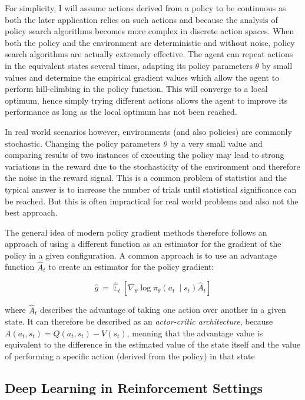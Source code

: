 For simplicity, I will assume actions derived from a policy to be continuous as both the later application relies on
such actions and because the analysis of policy search algorithms becomes more complex in discrete action spaces. When
both the policy and the environment are deterministic and without noise, policy search algorithms are actually extremely
effective. The agent can repeat actions in the equivalent states several times, adapting its policy parameters $\theta$ by
small values and determine the empirical gradient values which allow the agent to perform hill-climbing in the policy
function. This will converge to a local optimum, hence simply trying different actions allows the agent to improve its
performance as long as the local optimum has not been reached.

In real world scenarios however, environments (and also policies) are commonly stochastic. Changing the policy
parameters $\theta$ by a very small value and comparing results of two instances of executing the policy may lead to
strong variations in the reward due to the stochasticity of the environment and therefore the noise in the reward
signal. This is a common problem of statistics and the typical answer is to increase the number of trials until
statistical significance can be reached. But this is often impractical for real world problems and also not the best
approach.

The general idea of modern policy gradient methods therefore follows an approach of using a different function as an
estimator for the gradient of the policy in a given configuration. A common approach is to use an advantage function
$\hat{A}_t$ to create an estimator for the policy gradient:


\begin{equation}
    \hat{g} \ =\ \hat{\mathbb{E}}_{t} \ \left[ \nabla _{\theta }\log \pi _{\theta }( a_{t} \ \mid s_{t})\hat{A}_{t}  \right]
\end{equation}

where $\hat{A}_t$ describes the advantage of taking one action over another in a given state. It can therefore be
described as an \emph{actor-critic architecture}, because $A(a_t, s_t) = Q(a_t,s_t) - V(s_t)$, meaning that the
advantage value is equivalent to the difference in the estimated value of the state itself and the value of performing
a specific action (derived from the policy) in that state \citep{mnih2016asynchronous}

\subsection{Deep Learning in Reinforcement Settings}%
\label{sub:deep_learning_in_reinforcement_settings}

